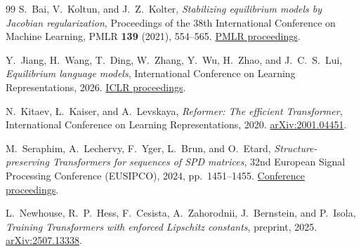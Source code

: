 \documentclass[11pt]{amsart}
\numberwithin{equation}{section}
\theoremstyle{plain}
\begin{document}
\begin{thebibliography}{99}
S.~Bai, V.~Koltun, and J.~Z.~Kolter,
\emph{Stabilizing equilibrium models by Jacobian regularization},
Proceedings of the 38th International Conference on Machine Learning,
PMLR \textbf{139} (2021), 554--565.
\href{https://proceedings.mlr.press/v139/bai21b.html}{PMLR proceedings}.

Y.~Jiang, H.~Wang, T.~Ding, W.~Zhang, Y.~Wu, H.~Zhao, and J.~C.~S.~Lui,
\emph{Equilibrium language models},
International Conference on Learning Representations, 2026.
\href{https://proceedings.iclr.cc/paper_files/paper/2026/hash/6041ba59d44d7d1c150334b8bb02497c-Abstract-Conference.html}
{ICLR proceedings}.

N.~Kitaev, \L.~Kaiser, and A.~Levskaya,
\emph{Reformer: The efficient Transformer},
International Conference on Learning Representations, 2020.
\href{https://arxiv.org/abs/2001.04451}{arXiv:2001.04451}.

M.~Seraphim, A.~Lechervy, F.~Yger, L.~Brun, and O.~Etard,
\emph{Structure-preserving Transformers for sequences of SPD matrices},
32nd European Signal Processing Conference (EUSIPCO), 2024, pp.~1451--1455.
\href{https://eurasip.org/Proceedings/Eusipco/Eusipco2024/pdfs/0001451.pdf}
{Conference proceedings}.

L.~Newhouse, R.~P.~Hess, F.~Cesista, A.~Zahorodnii, J.~Bernstein, and P.~Isola,
\emph{Training Transformers with enforced Lipschitz constants},
preprint, 2025.
\href{https://arxiv.org/abs/2507.13338}{arXiv:2507.13338}.

\end{thebibliography}
\end{document}

